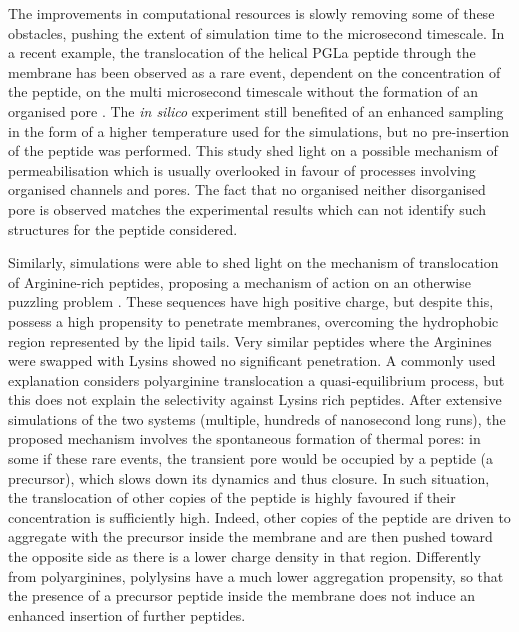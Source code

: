 The improvements in computational resources is slowly removing some of these obstacles, pushing the extent of simulation time to the microsecond timescale.
%
In a recent example, the translocation of the helical PGLa peptide through the membrane has been observed as a rare event, dependent on the concentration of the peptide, on the multi microsecond timescale without the formation of an organised pore \cite{Ulmschneider2017}. The \emph{in silico} experiment still benefited of an enhanced sampling in the form of a higher temperature used for the simulations, but no pre-insertion of the peptide was performed.  This study shed light on a possible mechanism of permeabilisation which is usually overlooked in favour of processes involving organised channels and pores. The fact that no organised neither disorganised pore is observed matches the experimental results which can not identify such structures for the peptide considered. 

Similarly, simulations were able to shed light on the mechanism of translocation of Arginine-rich peptides, proposing a mechanism of action on an otherwise puzzling problem \cite{Sun2015}. These sequences have high positive charge, but despite this, possess a high propensity to penetrate membranes, overcoming the hydrophobic region represented by the lipid tails. Very similar peptides where the Arginines were swapped with Lysins showed no significant penetration.
%
A commonly used explanation considers polyarginine translocation a quasi-equilibrium process, but this does not explain the selectivity against Lysins rich peptides.
%
After extensive simulations of the two systems (multiple, hundreds of nanosecond long runs), the proposed mechanism involves the spontaneous formation of thermal pores: in some if these rare events, the transient pore would be occupied by a peptide (a precursor), which slows down its dynamics and thus closure. In such situation, the translocation of other copies of the peptide is highly favoured if their concentration is sufficiently high. Indeed, other copies of the peptide are driven to aggregate with the precursor inside the membrane and are then pushed toward the opposite side as there is a lower charge density in that region.
%
Differently from polyarginines, polylysins have a much lower aggregation propensity, so that the presence of a precursor peptide inside the membrane does not induce an enhanced insertion of further peptides.

